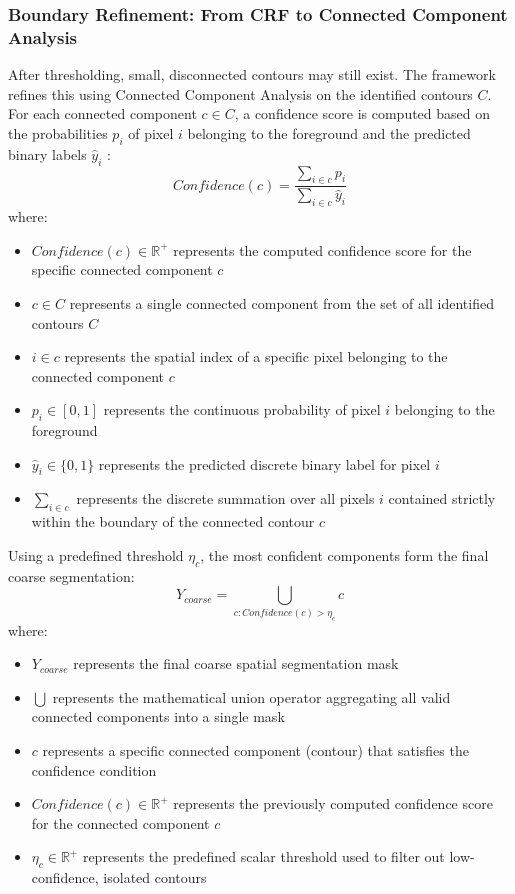 \subsubsection{Boundary Refinement: From CRF to Connected Component Analysis}
\label{sec:refinement}
After thresholding, small, disconnected contours may still exist. The framework refines this using Connected Component Analysis on the identified contours $C$. For each connected component $c \in C$, a confidence score is computed based on the probabilities $p_i$ of pixel $i$ belonging to the foreground and the predicted binary labels $\hat{y}_i$ \cite{medclipsam}:
\begin{equation}
Confidence(c) = \frac{\sum_{i \in c} p_i}{\sum_{i \in c} \hat{y}_i}
\end{equation}
where:
\begin{itemize}
\item $Confidence(c) \in \mathbb{R}^+$ represents the computed confidence score for the specific connected component $c$
\item $c \in C$ represents a single connected component from the set of all identified contours $C$
\item $i \in c$ represents the spatial index of a specific pixel belonging to the connected component $c$
\item $p_i \in [0,1]$ represents the continuous probability of pixel $i$ belonging to the foreground
\item $\hat{y}_i \in \{0,1\}$ represents the predicted discrete binary label for pixel $i$
\item $\sum_{i \in c}$ represents the discrete summation over all pixels $i$ contained strictly within the boundary of the connected contour $c$
\end{itemize}

Using a predefined threshold $\eta_c$, the most confident components form the final coarse segmentation:
\begin{equation}
Y_{coarse} = \bigcup_{c : Confidence(c) > \eta_c} c
\end{equation}
where:
\begin{itemize}
\item $Y_{coarse}$ represents the final coarse spatial segmentation mask
\item $\bigcup$ represents the mathematical union operator aggregating all valid connected components into a single mask
\item $c$ represents a specific connected component (contour) that satisfies the confidence condition
\item $Confidence(c) \in \mathbb{R}^+$ represents the previously computed confidence score for the connected component $c$
\item $\eta_c \in \mathbb{R}^+$ represents the predefined scalar threshold used to filter out low-confidence, isolated contours
\end{itemize}

